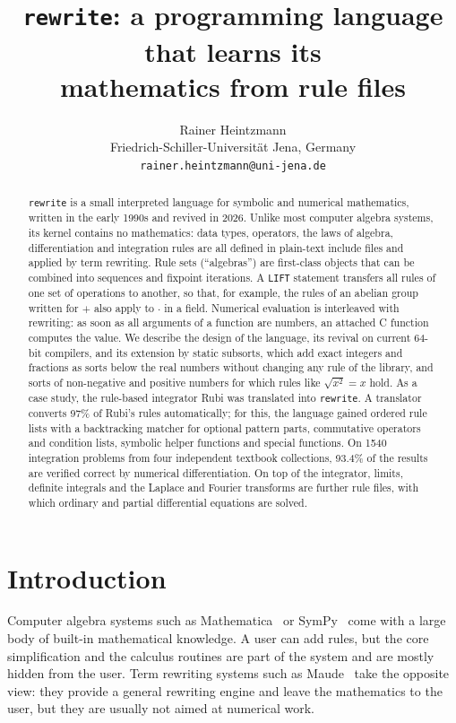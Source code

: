 \documentclass[11pt,a4paper]{article}
\title{\texttt{rewrite}: a programming language that learns its\\
       mathematics from rule files}
\author{Rainer Heintzmann\\
        Friedrich-Schiller-Universit\"at Jena, Germany\\
        \texttt{rainer.heintzmann@uni-jena.de}}
\date{}
\newcommand{\nproblems}{1540}
\newcommand{\psolved}{93.4\%}
\begin{document}
\maketitle

\begin{abstract}
\texttt{rewrite} is a small interpreted language for symbolic and numerical
mathematics, written in the early 1990s and revived in 2026. Unlike most
computer algebra systems, its kernel contains no mathematics: data types,
operators, the laws of algebra, differentiation and integration rules are
all defined in plain-text include files and applied by term rewriting. Rule
sets (``algebras'') are first-class objects that can be combined into
sequences and fixpoint iterations. A \texttt{LIFT} statement transfers all
rules of one set of operations to another, so that, for example, the rules
of an abelian group written for $+$ also apply to $\cdot$ in a field.
Numerical evaluation is interleaved with rewriting: as soon as all
arguments of a function are numbers, an attached C function computes the
value. We describe the design of the language, its revival on current
64-bit compilers, and its extension by static subsorts, which add exact
integers and fractions as sorts below the real numbers without changing
any rule of the library, and sorts of non-negative and positive numbers
for which rules like $\sqrt{x^2}=x$ hold. As a case study, the rule-based
integrator Rubi was translated into \texttt{rewrite}. A translator converts
97\% of Rubi's rules automatically; for this, the language gained ordered rule lists
with a backtracking matcher for optional pattern parts, commutative
operators and condition lists, symbolic helper functions and special
functions. On \nproblems{} integration problems from four independent
textbook collections, \psolved{} of the results are verified correct by
numerical differentiation. On top of the integrator, limits, definite
integrals and the Laplace and Fourier transforms are further rule files,
with which ordinary and partial differential equations are solved.
\end{abstract}

\section{Introduction}

Computer algebra systems such as Mathematica~\cite{mathematica} or
SymPy~\cite{meurer2017sympy} come with a large body of built-in mathematical
knowledge. A user can add rules, but the core simplification and the
calculus routines are part of the system and are mostly hidden from the
user. Term rewriting systems such as Maude~\cite{clavel2007maude} take the
opposite view: they provide a general rewriting engine and leave the
mathematics to the user, but they are usually not aimed at numerical work.
\end{document}
